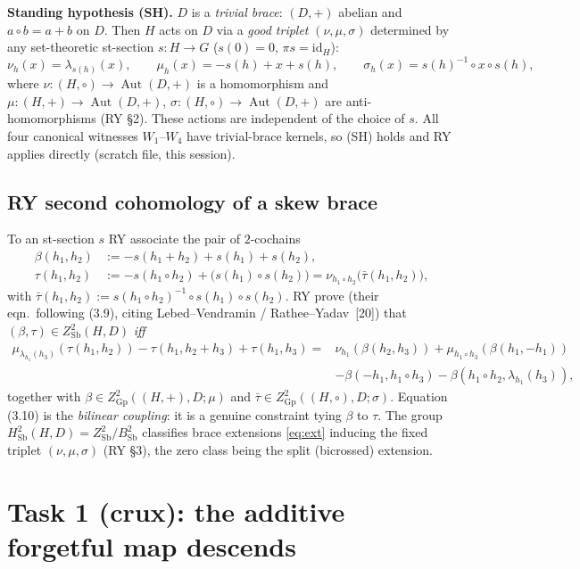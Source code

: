 \documentclass[11pt]{article}
\theoremstyle{definition}
\newcommand{\Sb}{\mathrm{Sb}}
\newcommand{\Gp}{\mathrm{Gp}}
\newcommand{\id}{\mathrm{id}}
\begin{document}
\medskip
\noindent\textbf{Standing hypothesis (SH).} $D$ is a \emph{trivial brace}: $(D,+)$ abelian and
$a\circ b=a+b$ on $D$. Then $H$ acts on $D$ via a \emph{good triplet} $(\nu,\mu,\sigma)$
determined by any set-theoretic st-section $s:H\to G$ ($s(0)=0$, $\pi s=\id_H$):
\[
\nu_h(x)=\lambda_{s(h)}(x),\qquad
\mu_h(x)=-s(h)+x+s(h),\qquad
\sigma_h(x)=s(h)^{-1}\circ x\circ s(h),
\]
where $\nu:(H,\circ)\to\operatorname{Aut}(D,+)$ is a homomorphism and
$\mu:(H,+)\to\operatorname{Aut}(D,+)$, $\sigma:(H,\circ)\to\operatorname{Aut}(D,+)$
are anti-homomorphisms (RY \S2). These actions are independent of the choice of $s$.
All four canonical witnesses $W_1$--$W_4$ have trivial-brace kernels, so (SH) holds and RY
applies directly (scratch file, this session).

\subsection*{RY second cohomology of a skew brace}

To an st-section $s$ RY associate the pair of $2$-cochains
\begin{align}
\beta(h_1,h_2)&:=-s(h_1+h_2)+s(h_1)+s(h_2),\label{eq:beta}\\
\tau(h_1,h_2)&:=-s(h_1\circ h_2)+\bigl(s(h_1)\circ s(h_2)\bigr)
=\nu_{h_1\circ h_2}\bigl(\bar\tau(h_1,h_2)\bigr),\label{eq:tau}
\end{align}
with $\bar\tau(h_1,h_2):=s(h_1\circ h_2)^{-1}\circ s(h_1)\circ s(h_2)$.
RY prove (their eqn.\ following (3.9), citing Lebed--Vendramin / Rathee--Yadav~[20]) that
$(\beta,\tau)\in Z^2_\Sb(H,D)$ \emph{iff}
\begin{equation}\label{eq:310}
\begin{aligned}
\mu_{\lambda_{h_1}(h_3)}(\tau(h_1,h_2))-\tau(h_1,h_2+h_3)+\tau(h_1,h_3)
={}&\nu_{h_1}(\beta(h_2,h_3))+\mu_{h_1\circ h_3}(\beta(h_1,-h_1))\\
&-\beta(-h_1,h_1\circ h_3)-\beta(h_1\circ h_2,\lambda_{h_1}(h_3)),
\end{aligned}
\tag{3.10}
\end{equation}
together with $\beta\in Z^2_\Gp((H,+),D;\mu)$ and $\bar\tau\in Z^2_\Gp((H,\circ),D;\sigma)$.
Equation (3.10) is the \emph{bilinear coupling}: it is a genuine constraint tying $\beta$ to
$\tau$. The group $H^2_\Sb(H,D)=Z^2_\Sb/B^2_\Sb$ classifies brace extensions
\eqref{eq:ext} inducing the fixed triplet $(\nu,\mu,\sigma)$ (RY \S3), the zero class being
the split (bicrossed) extension.

\section{Task 1 (crux): the additive forgetful map descends}\label{sec:crux}
\end{document}

